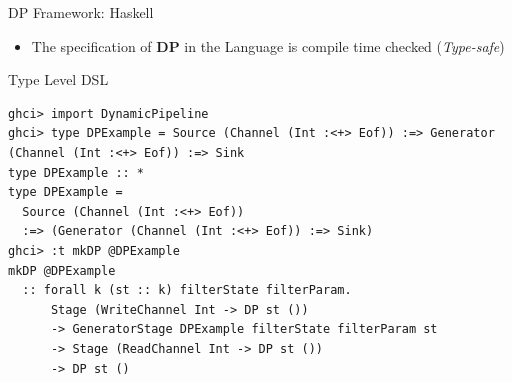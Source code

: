 \documentclass{beamer}
\begin{document}
  \begin{frame}[fragile]{DP Framework: Haskell}
    \begin{itemize}
      \item The specification of \textbf{DP} in the Language is compile time checked (\textit{Type-safe})
    \end{itemize}    
    \begin{exampleblock}{Type Level DSL}
      \begin{verbatim}      
ghci> import DynamicPipeline
ghci> type DPExample = Source (Channel (Int :<+> Eof)) :=> Generator (Channel (Int :<+> Eof)) :=> Sink
type DPExample :: *
type DPExample =
  Source (Channel (Int :<+> Eof))
  :=> (Generator (Channel (Int :<+> Eof)) :=> Sink)
ghci> :t mkDP @DPExample
mkDP @DPExample
  :: forall k (st :: k) filterState filterParam.
      Stage (WriteChannel Int -> DP st ())
      -> GeneratorStage DPExample filterState filterParam st
      -> Stage (ReadChannel Int -> DP st ())
      -> DP st ()    
    \end{verbatim}
    \end{exampleblock}
  \end{frame}



\end{document}
